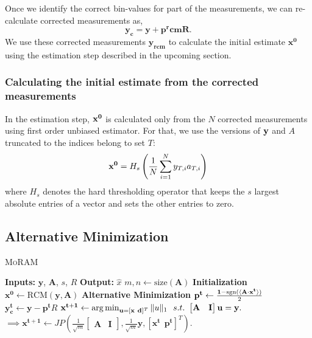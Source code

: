 Once we identify the correct bin-values for part of the measurements, we can re-calculate corrected measurements as,
$$
\mathbf{y_{c} = y + p^rcmR}.
$$
We use these corrected measurements $\mathbf{y_{rcm}}$ to calculate the initial estimate $\mathbf{{x}^0}$ using the estimation step described in the upcoming section.

\subsubsection{Calculating the initial estimate from the corrected measurements}
In the estimation step, $\mathbf{x^0}$ is calculated only from the $N$ corrected measurements using first order unbiased estimator. For that, we use the versions of $\mathbf{y}$ and $A$ truncated to the indices belong to set $T$:
\begin{equation}
\mathbf{x^0} = H_s\left( \frac{1}{N}\sum_{i=1}^{N}y_{T,i}a_{T,i}\right)
\label{eq:init}
\end{equation}
where $H_s$ denotes the hard thresholding operator that keeps the $s$ largest absolute entries of a vector and sets the other entries to zero.

\subsection{Alternative Minimization}
\label{sec:altmin}
\begin{algorithm}[H]
	\caption{\textsc{MoRAM}}
	\label{alg:MoRAM}
	\begin{algorithmic}
		\State\textbf{Inputs:} $\mathbf{y}$, $\mathbf{A}$, $s$, $R$
		\State\textbf{Output:}  $\widehat{x}$
		\State $m,n \leftarrow \mathrm{size}(\mathbf{A})$ 
		\State \textbf{Initialization}
		\State $\mathbf{x^0} \leftarrow \textrm{RCM}(\mathbf{y, A})$ 
		\State \textbf{Alternative Minimization}
		\State $\mathbf{{p}^{t}} \leftarrow \frac{\mathbf{1}-\mathrm{sgn}(\langle \mathbf{A} \cdot \mathbf{x^t} \rangle)}{2}$
		\State $\mathbf{y^t_c} \leftarrow \mathbf{y} - \mathbf{p^t}R$
		\State $\mathbf{{x}^{t+1}}\leftarrow \operatorname*{arg\,min}_{\mathbf{u}=[\mathbf{x~d}]^T}\|u\|_1 ~~ s.t.~ \begin{bmatrix} \mathbf{A} & \mathbf{I} \end{bmatrix}\mathbf{u} = \mathbf{y}.$ 
		\State $\implies \mathbf{{x}^{t+1}}\leftarrow JP(\frac{1}{\sqrt{m}}\begin{bmatrix} \mathbf{A} & \mathbf{I} \end{bmatrix},\frac{1}{\sqrt{m}}\mathbf{y},[\mathbf{x^t~~p^t}]^T)$.
		\EndFor
	\end{algorithmic}
\end{algorithm}


